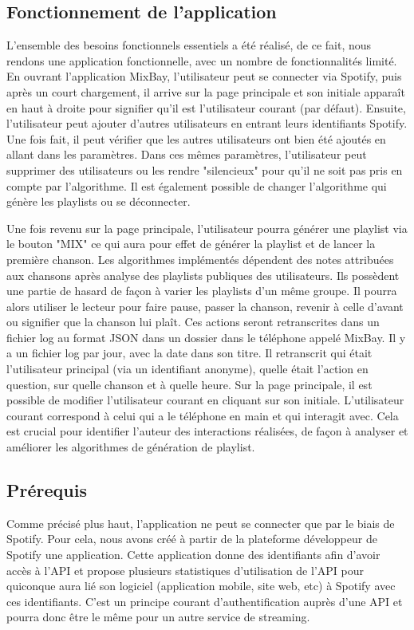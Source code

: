 \documentclass{article}
\begin{document}
		\subsection{Fonctionnement de l'application}
		L'ensemble des besoins fonctionnels essentiels a été réalisé, de ce fait, nous rendons une application fonctionnelle, avec un nombre de fonctionnalités limité. En ouvrant l'application MixBay, l'utilisateur peut se connecter via Spotify, puis après un court chargement, il arrive sur la page principale et son initiale apparaît en haut à droite pour signifier qu'il est l'utilisateur courant (par défaut). Ensuite, l'utilisateur peut ajouter d'autres utilisateurs en entrant leurs identifiants Spotify. Une fois fait, il peut vérifier que les autres utilisateurs ont bien été ajoutés en allant dans les paramètres. Dans ces mêmes paramètres, l'utilisateur peut supprimer  des utilisateurs ou les rendre "silencieux" pour qu'il ne soit pas pris en compte par l'algorithme. Il est également possible de changer l'algorithme qui génère les playlists ou se déconnecter. 
		
		Une fois revenu sur la page principale, l'utilisateur pourra générer une playlist via le bouton "MIX" ce qui aura pour effet de générer la playlist et de lancer la première chanson. Les algorithmes implémentés dépendent des notes attribuées aux chansons après analyse des playlists publiques des utilisateurs. Ils possèdent une partie de hasard de façon à varier les playlists d'un même groupe. Il pourra alors utiliser le lecteur pour faire pause, passer la chanson, revenir à celle d'avant ou signifier que la chanson lui plaît. Ces actions seront retranscrites dans un fichier log au format JSON dans un dossier dans le téléphone appelé MixBay. Il y a un fichier log par jour, avec la date dans son titre. Il retranscrit qui était l'utilisateur principal (via un identifiant anonyme), quelle était l'action en question, sur quelle chanson et à quelle heure. Sur la page principale, il est possible de modifier l'utilisateur courant en cliquant sur son initiale. L'utilisateur courant correspond à celui qui a le téléphone en main et qui interagit avec. Cela est crucial pour identifier l'auteur des interactions réalisées, de façon à analyser et améliorer les algorithmes de génération de playlist.
		
		\subsection{Prérequis}
		Comme précisé plus haut, l'application ne peut se connecter que par le biais de Spotify. Pour cela, nous avons créé à partir de la plateforme développeur de Spotify une application. Cette application donne des identifiants afin d'avoir accès à l'API et propose plusieurs statistiques d'utilisation de l'API pour quiconque aura lié son logiciel (application mobile, site web, etc) à Spotify avec ces identifiants. C'est un principe courant d'authentification auprès d'une API et pourra donc être le même pour un autre service de streaming.
		
\end{document}
